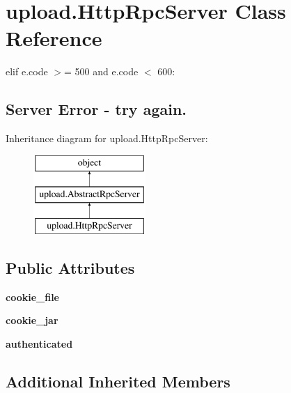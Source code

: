 \hypertarget{classupload_1_1_http_rpc_server}{}\section{upload.\+Http\+Rpc\+Server Class Reference}
\label{classupload_1_1_http_rpc_server}


elif e.\+code $>$= 500 and e.\+code $<$ 600\+: \subsection*{Server Error -\/ try again.} 


Inheritance diagram for upload.\+Http\+Rpc\+Server\+:\begin{figure}[H]
\begin{center}
\leavevmode
\includegraphics[height=3.000000cm]{classupload_1_1_http_rpc_server}
\end{center}
\end{figure}
\subsection*{Public Attributes}
\begin{DoxyCompactItemize}
\item 
\mbox{\label{classupload_1_1_http_rpc_server_ad5c1a730c030f9d3b5f70c2e0d8b9a1d}} 
{\bfseries cookie\+\_\+file}
\item 
\mbox{\label{classupload_1_1_http_rpc_server_a1b9c9af7f0a46afd84a9d524782323bf}} 
{\bfseries cookie\+\_\+jar}
\item 
\mbox{\label{classupload_1_1_http_rpc_server_aaa356e2491537dd0d4bfc5b1bb0fec96}} 
{\bfseries authenticated}
\end{DoxyCompactItemize}
\subsection*{Additional Inherited Members}


